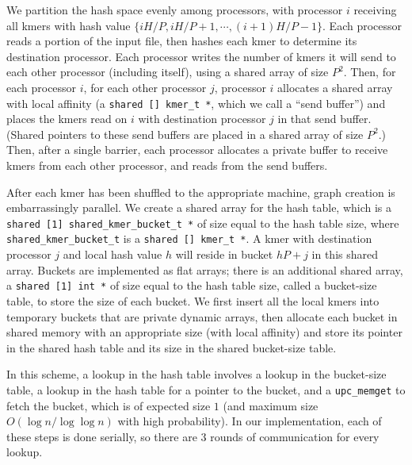 \documentclass{article}
\begin{document}
We partition the hash space evenly among processors, with processor $i$ receiving all kmers with hash value $\{iH/P, iH/P+1, \cdots, (i+1)H/P-1\}$.  Each processor reads a portion of the input file, then hashes each kmer to determine its destination processor.  Each processor writes the number of kmers it will send to each other processor (including itself), using a shared array of size $P^2$.  Then, for each processor $i$, for each other processor $j$, processor $i$ allocates a shared array with local affinity (a \texttt{shared [] kmer\_t *}, which we call a ``send buffer'') and places the kmers read on $i$ with destination processor $j$ in that send buffer.  (Shared pointers to these send buffers are placed in a shared array of size $P^2$.)  Then, after a single barrier, each processor allocates a private buffer to receive kmers from each other processor, and reads from the send buffers.

After each kmer has been shuffled to the appropriate machine, graph creation is embarrassingly parallel.  We create a shared array for the hash table, which is a \texttt{shared [1] shared\_kmer\_bucket\_t *} of size equal to the hash table size, where \texttt{shared\_kmer\_bucket\_t} is a \texttt{shared [] kmer\_t *}.  A kmer with destination processor $j$ and local hash value $h$ will reside in bucket $hP+j$ in this shared array.  Buckets are implemented as flat arrays; there is an additional shared array, a \texttt{shared [1] int *} of size equal to the hash table size, called a bucket-size table, to store the size of each bucket.  We first insert all the local kmers into temporary buckets that are private dynamic arrays, then allocate each bucket in shared memory with an appropriate size (with local affinity) and store its pointer in the shared hash table and its size in the shared bucket-size table.

In this scheme, a lookup in the hash table involves a lookup in the bucket-size table, a lookup in the hash table for a pointer to the bucket, and a \texttt{upc_memget} to fetch the bucket, which is of expected size $1$ (and maximum size $O(\log n / \log \log n)$ with high probability).  In our implementation, each of these steps is done serially, so there are $3$ rounds of communication for every lookup.
\end{document}
